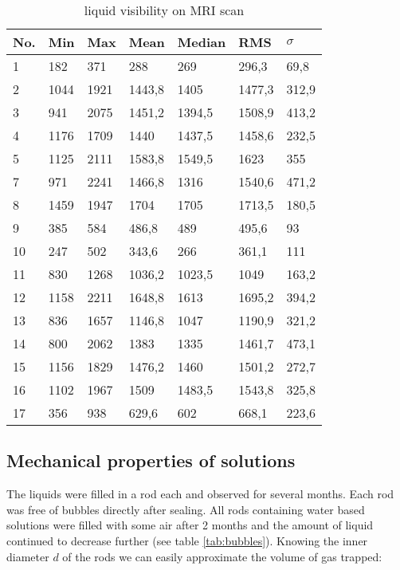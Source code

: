 \begin{table}[!htb]
\centering
\begin{tabular}{@{}lllllll@{}}
\toprule
No. & Min  & Max  & Mean   & Median & RMS    & $\sigma$   \\ \midrule
1   & 182  & 371  & 288    & 269    & 296,3  & 69,8   \\
2   & 1044 & 1921 & 1443,8 & 1405   & 1477,3 & 312,9  \\
3   & 941  & 2075 & 1451,2 & 1394,5 & 1508,9 & 413,2  \\
4   & 1176 & 1709 & 1440   & 1437,5 & 1458,6 & 232,5  \\
5   & 1125 & 2111 & 1583,8 & 1549,5 & 1623   & 355    \\
7   & 971  & 2241 & 1466,8 & 1316   & 1540,6 & 471,2  \\
8   & 1459 & 1947 & 1704   & 1705   & 1713,5 & 180,5  \\
9   & 385  & 584  & 486,8  & 489    & 495,6  & 93     \\
10  & 247  & 502  & 343,6  & 266    & 361,1  & 111    \\
11  & 830  & 1268 & 1036,2 & 1023,5 & 1049   & 163,2  \\
12  & 1158 & 2211 & 1648,8 & 1613   & 1695,2 & 394,2  \\
13  & 836  & 1657 & 1146,8 & 1047   & 1190,9 & 321,2  \\
14  & 800  & 2062 & 1383   & 1335   & 1461,7 & 473,1  \\
15  & 1156 & 1829 & 1476,2 & 1460   & 1501,2 & 272,7  \\
16  & 1102 & 1967 & 1509   & 1483,5 & 1543,8 & 325,8  \\
17  & 356  & 938  & 629,6  & 602    & 668,1  & 223,6  \\ \bottomrule
\end{tabular}
\caption{liquid visibility on MRI scan}
\label{tab:visibility}
\end{table}

\clearpage

\subsection{Mechanical properties of solutions}
\label{sec:sol-mech}

The liquids were filled in a rod each and observed for several months.
Each rod was free of bubbles directly after sealing.
All rods containing water based solutions were filled with some air after 2 months and the amount of liquid continued to decrease further (see table \ref{tab:bubbles}).
Knowing the inner diameter $d$ of the rods we can easily approximate the volume of gas trapped:


